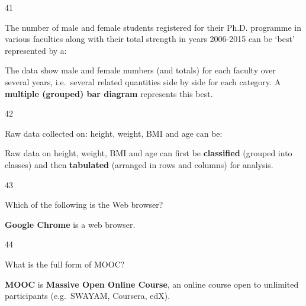 \begin{question}{41}
{The number of male and female students registered for their Ph.D. programme in various faculties along with their total strength in years 2006-2015 can be `best' represented by a:\par}
\begin{explain}
The data show male and female numbers (and totals) for each faculty over several years, i.e.\ several related quantities side by side for each category. A \textbf{multiple (grouped) bar diagram} represents this best.
\end{explain}
\end{question}

\begin{question}{42}
{Raw data collected on: height, weight, BMI and age can be:\par}
\begin{explain}
Raw data on height, weight, BMI and age can first be \textbf{classified} (grouped into classes) and then \textbf{tabulated} (arranged in rows and columns) for analysis.
\end{explain}
\end{question}

\begin{question}{43}
{Which of the following is the Web browser?\par}
\begin{explain}
\textbf{Google Chrome} is a web browser.
\end{explain}
\end{question}

\begin{question}{44}
{What is the full form of MOOC?\par}
\begin{explain}
\textbf{MOOC} is \textbf{Massive Open Online Course}, an online course open to unlimited participants (e.g.\ SWAYAM, Coursera, edX).
\end{explain}
\end{question}

